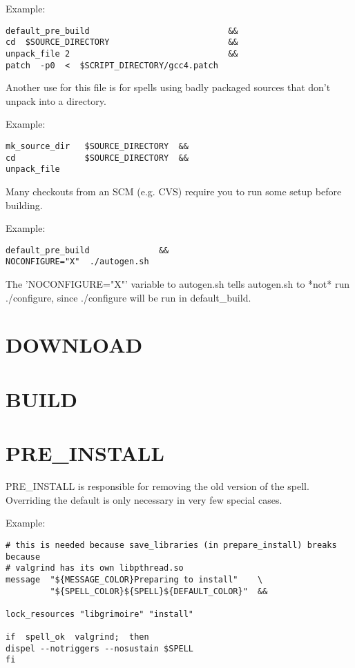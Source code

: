 \documentclass[a4paper,10pt]{book}
\begin{document}
Example:
\begin{verbatim}
default_pre_build                            &&
cd  $SOURCE_DIRECTORY                        &&
unpack_file 2                                &&
patch  -p0  <  $SCRIPT_DIRECTORY/gcc4.patch
\end{verbatim}

Another use for this file is for spells using badly packaged sources that don't
unpack into a directory.

Example:
\begin{verbatim}
mk_source_dir   $SOURCE_DIRECTORY  &&
cd              $SOURCE_DIRECTORY  &&
unpack_file
\end{verbatim}

Many checkouts from an SCM (e.g. CVS) require you to run some setup before
building.

Example:
\begin{verbatim}
default_pre_build              &&
NOCONFIGURE="X"  ./autogen.sh
\end{verbatim}

The 'NOCONFIGURE="X"' variable to autogen.sh tells autogen.sh to *not* run
./configure, since ./configure will be run in default\_build.

\section{DOWNLOAD}

\section{BUILD}
\section{PRE\_INSTALL}
PRE\_INSTALL is responsible for removing the old version of the spell.
Overriding the default is only necessary in very few special cases.

Example:
\begin{verbatim}
# this is needed because save_libraries (in prepare_install) breaks because
# valgrind has its own libpthread.so
message  "${MESSAGE_COLOR}Preparing to install"    \
         "${SPELL_COLOR}${SPELL}${DEFAULT_COLOR}"  &&

lock_resources "libgrimoire" "install"

if  spell_ok  valgrind;  then
dispel --notriggers --nosustain $SPELL
fi
\end{verbatim}
\end{document}
